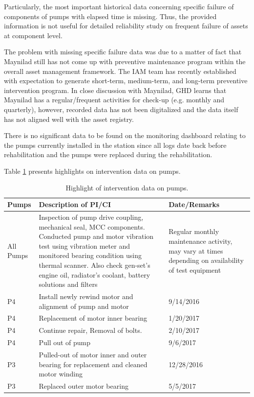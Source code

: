 Particularly, the most important historical data concerning specific failure of components of pumps with elapsed time is missing. Thus, the provided information is not useful for detailed reliability study on frequent failure of assets at component level. 

The problem with missing specific failure data was due to a matter of fact that Maynilad still has not come up with preventive maintenance program within the overall asset management framework. The IAM team has recently established with expectation to generate short-term, medium-term, and long-term preventive intervention program. In close discussion with Maynilad, GHD learns that Maynilad has a regular/frequent activities for check-up (e.g. monthly and quarterly), however, recorded data has not been digitalized and the data itself has not aligned well with the asset registry. 

There is no significant data to be found on the monitoring dashboard relating to the pumps currently installed in the station since all logs date back before rehabilitation and the pumps were replaced during the rehabilitation. 


Table \ref{interventiondata} presents highlights on intervention data on pumps.

\begin{table}[h]
	\caption{Highlight of intervention data on pumps.}
	\label{interventiondata}
	{\footnotesize
		\begin{tabular}{l|p{6cm}|p{6cm}}
			\hline
			Pumps & Description of PI/CI & Date/Remarks \\ 
			\hline
			All Pumps & Inspection of pump drive coupling, mechanical seal, MCC components. Conducted pump and motor vibration test using vibration meter and monitored bearing condition using thermal scanner. Also check gen-set's engine oil, radiator's coolant, battery solutions and filters & Regular monthly maintenance activity, may vary at times depending on availability of test equipment \\ 
			\hline
			P4 & Install newly rewind motor and alignment of pump and motor & 9/14/2016 \\ 
			P4 & Replacement of motor inner bearing & 1/20/2017  \\ 
			P4 & Continue repair, Removal of bolts. & 2/10/2017 \\ 
			P4 & Pull out of pump & 9/6/2017  \\ 
			\hline
			P3 & Pulled-out of motor inner and outer bearing for replacement and cleaned motor winding & 12/28/2016 \\ 
			P3 & Replaced outer motor bearing & 5/5/2017 \\ 
			\hline
			
		\end{tabular}
		
	}
\end{table}



